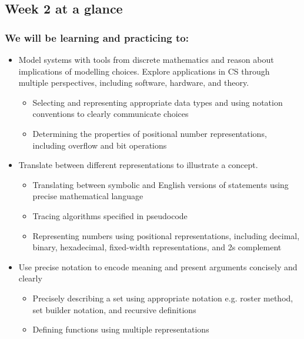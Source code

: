 \documentclass[12pt, oneside]{article}
\begin{document}
\begin{flushright}
\end{flushright} 
\subsection*{Week 2 at a glance}

\subsubsection*{We will be learning and practicing to:}
\begin{itemize}
\item Model systems with tools from discrete mathematics and reason about implications of modelling choices. Explore applications in CS through multiple perspectives, including software, hardware, and theory.
\begin{itemize}
   \item Selecting and representing appropriate data types and using notation conventions to clearly communicate choices
   \item Determining the properties of positional number representations, including overflow and bit operations
\end{itemize}

\item Translate between different representations to illustrate a concept.

\begin{itemize}
   \item Translating between symbolic and English versions of statements using precise mathematical language
   \item Tracing algorithms specified in pseudocode
   \item Representing numbers using positional representations, including decimal, binary, hexadecimal, fixed-width representations, and 2s complement
\end{itemize}


\item Use precise notation to encode meaning and present arguments concisely and clearly
\begin{itemize}
    \item Precisely describing a set using appropriate notation e.g. roster method, set builder notation, and recursive definitions
    \item Defining functions using multiple representations
\end{itemize}


\end{itemize}
\end{document}
